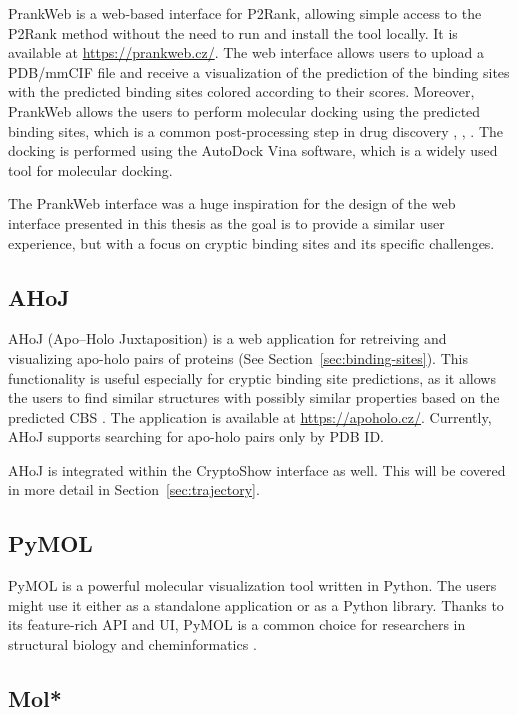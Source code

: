 PrankWeb is a web-based interface for P2Rank, allowing simple access to the P2Rank method without the need to run and install the tool locally. It is available at \url{https://prankweb.cz/}. The web interface allows users to upload a PDB/mmCIF file and receive a visualization of the prediction of the binding sites with the predicted binding sites colored according to their scores. Moreover, PrankWeb allows the users to perform molecular docking using the predicted binding sites, which is a common post-processing step in drug discovery \cite{polak2025prankweb}, \cite{jakubec2022prankweb}, \cite{jendele2019prankweb}. The docking is performed using the AutoDock Vina \cite{trott2010autodock} software, which is a widely used tool for molecular docking.

The PrankWeb interface was a huge inspiration for the design of the web interface presented in this thesis as the goal is to provide a similar user experience, but with a focus on cryptic binding sites and its specific challenges.

\subsection{AHoJ}
\label{sec:ahoj}

AHoJ (Apo–Holo Juxtaposition) is a web application for retreiving and visualizing apo-holo pairs of proteins (See Section~\ref{sec:binding-sites}). This functionality is useful especially for cryptic binding site predictions, as it allows the users to find similar structures with possibly similar properties based on the predicted CBS \cite{feidakis2022ahoj}. The application is available at \url{https://apoholo.cz/}. Currently, AHoJ supports searching for apo-holo pairs only by PDB ID.

AHoJ is integrated within the CryptoShow interface as well. This will be covered in more detail in Section~\ref{sec:trajectory}.

\subsection{PyMOL}
\label{sec:pymol}

PyMOL is a powerful molecular visualization tool written in Python. The users might use it either as a standalone application or as a Python library. Thanks to its feature-rich API and UI, PyMOL is a common choice for researchers in structural biology and cheminformatics \cite{delano2002pymol}.

\subsection{Mol*}
\label{sec:molstar}

